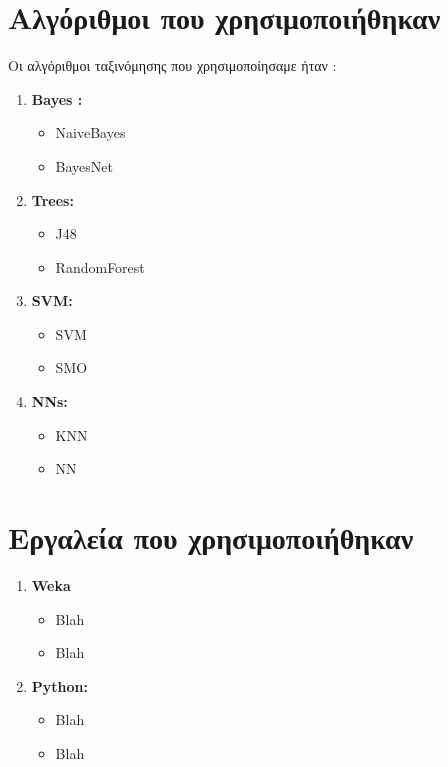 \section{Αλγόριθμοι που χρησιμοποιήθηκαν}
Οι αλγόριθμοι ταξινόμησης που χρησιμοποίησαμε ήταν :
\begin{enumerate}

  \item \textbf{Bayes :}
  \begin{itemize}
     \item NaiveBayes
     \item BayesNet
  \end{itemize}  
  \item \textbf{Trees:}
  \begin{itemize}
     \item J48
     \item RandomForest
  \end{itemize}
  \item \textbf{SVM:}  
  \begin{itemize}
     \item SVM
     \item SMO
  \end{itemize}
  \item \textbf{NNs:}
  \begin{itemize}
     \item KNN
     \item NN
  \end{itemize}

\end{enumerate}
\section{Εργαλεία που χρησιμοποιήθηκαν}
\begin{enumerate}

  \item \textbf{Weka}
  \begin{itemize}
     \item Blah
     \item Blah
  \end{itemize}  
  \item \textbf{Python:}
\begin{itemize}
     \item Blah
     \item Blah
  \end{itemize}
  \end{enumerate}